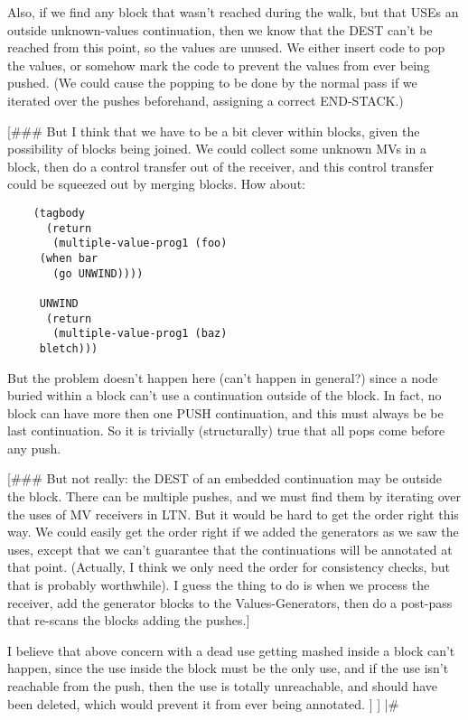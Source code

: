 Also, if we find any block that wasn't reached during the walk, but that USEs
an outside unknown-values continuation, then we know that the DEST can't be
reached from this point, so the values are unused.  We either insert code to
pop the values, or somehow mark the code to prevent the values from ever being
pushed.  (We could cause the popping to be done by the normal pass if we
iterated over the pushes beforehand, assigning a correct END-STACK.)

[\#\#\# But I think that we have to be a bit clever within blocks, given the
possibility of blocks being joined.  We could collect some unknown MVs in a
block, then do a control transfer out of the receiver, and this control
transfer could be squeezed out by merging blocks.  How about:

\begin{verbatim}
    (tagbody
      (return
       (multiple-value-prog1 (foo)
	 (when bar
	   (go UNWIND))))

     UNWIND
      (return
       (multiple-value-prog1 (baz)
	 bletch)))
\end{verbatim}

But the problem doesn't happen here (can't happen in general?) since a node
buried within a block can't use a continuation outside of the block.  In fact,
no block can have more then one PUSH continuation, and this must always be be
last continuation.  So it is trivially (structurally) true that all pops come
before any push.

[\#\#\# But not really: the DEST of an embedded continuation may be outside the
block.  There can be multiple pushes, and we must find them by iterating over
the uses of MV receivers in LTN.  But it would be hard to get the order right
this way.  We could easily get the order right if we added the generators as we
saw the uses, except that we can't guarantee that the continuations will be
annotated at that point.  (Actually, I think we only need the order for
consistency checks, but that is probably worthwhile).  I guess the thing to do
is when we process the receiver, add the generator blocks to the
Values-Generators, then do a post-pass that re-scans the blocks adding the
pushes.]

I believe that above concern with a dead use getting mashed inside a block
can't happen, since the use inside the block must be the only use, and if the
use isn't reachable from the push, then the use is totally unreachable, and
should have been deleted, which would prevent it from ever being
annotated.
]
]
|\#

